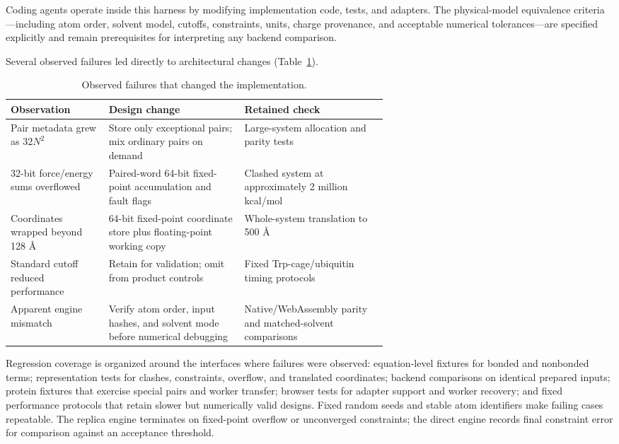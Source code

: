 \documentclass[11pt]{article}
\begin{document}
\begin{small}
Coding agents operate inside this harness by modifying implementation code, tests, and adapters. The physical-model equivalence criteria---including atom order, solvent model, cutoffs, constraints, units, charge provenance, and acceptable numerical tolerances---are specified explicitly and remain prerequisites for interpreting any backend comparison.

Several observed failures led directly to architectural changes (Table~\ref{tab:appA_failures}).

\begin{table}[htbp]
\centering\small
\caption{Observed failures that changed the implementation.}
\label{tab:appA_failures}
\begin{tabularx}{\linewidth}{@{}p{0.26\linewidth}p{0.36\linewidth}X@{}}
\toprule
\textbf{Observation} & \textbf{Design change} & \textbf{Retained check}\\
\midrule
Pair metadata grew as $32N^2$ & Store only exceptional pairs; mix ordinary pairs on demand & Large-system allocation and parity tests\\
32-bit force/energy sums overflowed & Paired-word 64-bit fixed-point accumulation and fault flags & Clashed system at approximately 2 million kcal/mol\\
Coordinates wrapped beyond 128 \AA{} & 64-bit fixed-point coordinate store plus floating-point working copy & Whole-system translation to 500 \AA{}\\
Standard cutoff reduced performance & Retain for validation; omit from product controls & Fixed Trp-cage/ubiquitin timing protocols\\
Apparent engine mismatch & Verify atom order, input hashes, and solvent mode before numerical debugging & Native/WebAssembly parity and matched-solvent comparisons\\
\bottomrule
\end{tabularx}
\end{table}

Regression coverage is organized around the interfaces where failures were observed: equation-level fixtures for bonded and nonbonded terms; representation tests for clashes, constraints, overflow, and translated coordinates; backend comparisons on identical prepared inputs; protein fixtures that exercise special pairs and worker transfer; browser tests for adapter support and worker recovery; and fixed performance protocols that retain slower but numerically valid designs. Fixed random seeds and stable atom identifiers make failing cases repeatable. The replica engine terminates on fixed-point overflow or unconverged constraints; the direct engine records final constraint error for comparison against an acceptance threshold.


\end{small}
\end{document}
